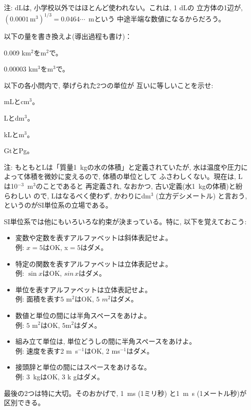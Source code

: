 {\small 注: dLは, 小学校以外ではほとんど使われない。これは, 1 dLの
立方体の1辺が, $(0.0001\,\text{m}^3)^{1/3}=0.0464\cdots$~mという
中途半端な数値になるからだろう。}

\begin{q}\label{q:alg_unit2} 以下の量を書き換えよ(導出過程も書け)：
\begin{edaenumerate}
\item 0.009 km$^2$をm$^2$で。
\item 0.00003 km$^3$をm$^3$で。
\end{edaenumerate}
\end{q}

\begin{q}\label{q:alg_unit3} 以下の各小問内で, 挙げられた2つの単位が
互いに等しいことを示せ:
\begin{edaenumerate}
\item mLとcm$^3$。
\item Lとdm$^3$。
\item kLとm$^3$。
\item GtとPg。
\end{edaenumerate}
\end{q}

{\small 注: もともとLは「質量1~kgの水の体積」と定義されていたが, 
水は温度や圧力によって体積を微妙に変えるので, 体積の単位として
ふさわしくない。現在は, Lは10$^{-3}$~m$^3$のことであると
再定義され, なおかつ, 古い定義(水1~kgの体積)と紛らわしい
ので, Lはなるべく使わず, かわりにdm$^3$ (立方デシメートル)
と言おう, というのがSI単位系の立場である。\\}

SI単位系では他にもいろいろな約束が決まっている。特に, 
以下を覚えておこう:
\begin{itemize}
\item 変数や定数を表すアルファベットは斜体表記せよ。\\
例: $x=5$はOK, x$=5$はダメ。
\item 特定の関数を表すアルファベットは立体表記せよ。\\
例: $\sin x$はOK, $sin\,x$はダメ。
\item 単位を表すアルファベットは立体表記せよ。\\
例: 面積を表す$5\,\,\text{m}^2$はOK, $5\,\,m^2$はダメ。
\item 数値と単位の間には半角スペースをあけよ。\\
例: $5\,\,\text{m}^2$はOK, $5\text{m}^2$はダメ。
\item 組み立て単位は, 単位どうしの間に半角スペースをあけよ。\\
例: 速度を表す2 m~s$^{-1}$はOK, 2 ms$^{-1}$はダメ。
\item 接頭辞と単位の間にはスペースをあけるな。\\
例: 3~kgはOK, 3 k gはダメ。
\end{itemize}
最後の2つは特に大切。そのおかげで, 1~ms (1ミリ秒)
と1~m~s (1メートル秒)が区別できる。

